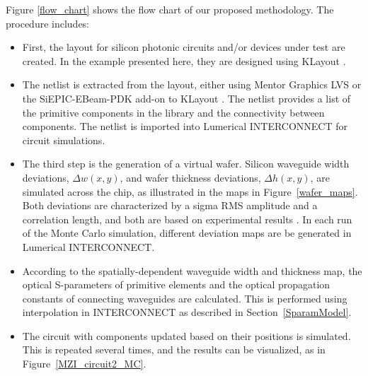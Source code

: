 \documentclass[journal]{spie}
\begin{document}
Figure \ref{flow_chart} shows the flow chart of our proposed methodology. The procedure includes: 
\begin{itemize}
\item First, the layout for silicon photonic circuits and/or devices under test are created.  In the example presented here, they are designed using KLayout \cite{www_klayout}. 
\item
The netlist is extracted from the layout, either using Mentor Graphics LVS or the SiEPIC-EBeam-PDK add-on \cite{siepic-ebeam-pdk} to KLayout \cite{www_klayout}.  The netlist provides a list of the primitive components in the library and the connectivity between components.  The netlist is imported into Lumerical INTERCONNECT for circuit simulations. 
\item
The third step is the generation of a virtual wafer.  Silicon waveguide width deviations, $\Delta w(x,y)$, and wafer thickness deviations, $\Delta h(x,y)$, are simulated across the chip, as illustrated in the maps in Figure~\ref{wafer_maps}. Both deviations are characterized by a sigma RMS amplitude and a correlation length, and both are based on experimental results \cite{lukas14:OFC,hochberg:wafer}. In each run of the Monte Carlo simulation, different deviation maps are be generated in Lumerical INTERCONNECT.
\item
According to the spatially-dependent waveguide width and thickness map, the optical S-parameters of primitive elements and the optical propagation constants of connecting waveguides are calculated.  This is performed using interpolation in INTERCONNECT as described in Section~\ref{SparamModel}. 
\item
The circuit with components updated based on their positions is simulated.  This is repeated several times, and the results can be visualized, as in Figure~\ref{MZI_circuit2_MC}. 
\end{itemize}
\end{document}
